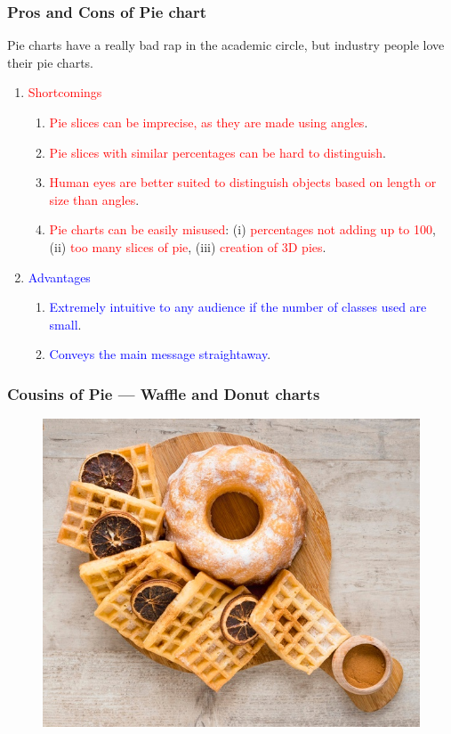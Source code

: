 \documentclass{beamer}
\begin{document}
\begin{frame}[t]\frametitle{Pros and Cons of Pie chart}
\small
Pie charts have a really bad rap in the academic circle, but industry people love their pie charts.
\begin{enumerate}
\item \textcolor{red}{Shortcomings}
\begin{enumerate}
\item  \textcolor{red}{Pie slices can be imprecise, as they are made using angles}.
\item  \textcolor{red}{Pie slices with similar percentages can be hard to distinguish}.
\item  \textcolor{red}{Human eyes are better suited to distinguish objects based on length or size than angles}.
\item  \textcolor{red}{Pie charts can be easily misused}: (i) \textcolor{red}{percentages not adding up to 100}, (ii) \textcolor{red}{too many slices of pie}, (iii) \textcolor{red}{creation of 3D pies}.  
\end{enumerate}
\item \textcolor{blue}{Advantages}
\begin{enumerate}
\item \textcolor{blue}{Extremely intuitive to any audience if the number of classes used are small}.
\item \textcolor{blue}{Conveys the main message straightaway}. 
\end{enumerate}
\end{enumerate}
\end{frame}


\begin{frame}[t]\frametitle{Cousins of Pie --- Waffle and Donut charts}
\begin{figure}
\includegraphics[width=0.85\linewidth]{PlotsLec1/donutswaffles}
\end{figure}
\end{frame}
\end{document}
